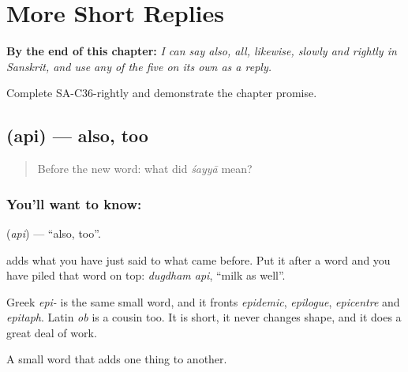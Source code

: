 
\chapter{More Short Replies}
\label{ch:sa-replies-more}

\begin{chapteropening}
\textbf{By the end of this chapter:} \emph{I can say also, all, likewise, slowly and rightly in Sanskrit, and use any of the five on its own as a reply.}

Complete SA-C36-rightly and demonstrate the chapter promise.
\end{chapteropening}

\section[\texorpdfstring{\sk{अपि} (api)}{अपि (api)}]{ (api) — also, too}

\label{lesson:SA-C36-also}



\begin{quote}
Before the new word: what did \emph{śayyā} mean?
\end{quote}

\subsection*{You'll want to know: }
\textbf{} (\emph{api}) — \textquotedblleft{}also, too\textquotedblright{}.

\textbf{} adds what you have just said to what came before. Put it after a word and you have piled that word on top: \emph{dugdham api}, \textquotedblleft{}milk as well\textquotedblright{}.

Greek \emph{epi-} is the same small word, and it fronts \emph{epidemic}, \emph{epilogue}, \emph{epicentre} and \emph{epitaph}. Latin \emph{ob} is a cousin too. It is short, it never changes shape, and it does a great deal of work.

\begin{grammarlens}[title={What you've built}]
A small word that adds one thing to another.
\end{grammarlens}

